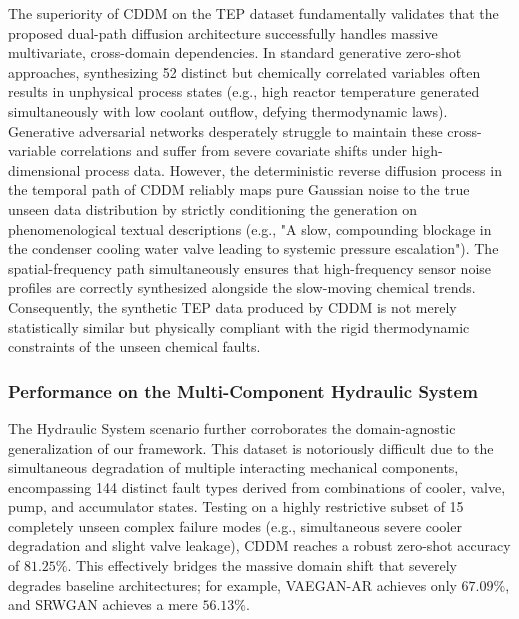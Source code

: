 The superiority of CDDM on the TEP dataset fundamentally validates that the proposed dual-path diffusion architecture successfully handles massive multivariate, cross-domain dependencies. In standard generative zero-shot approaches, synthesizing 52 distinct but chemically correlated variables often results in unphysical process states (e.g., high reactor temperature generated simultaneously with low coolant outflow, defying thermodynamic laws). Generative adversarial networks desperately struggle to maintain these cross-variable correlations and suffer from severe covariate shifts under high-dimensional process data. However, the deterministic reverse diffusion process in the temporal path of CDDM reliably maps pure Gaussian noise to the true unseen data distribution by strictly conditioning the generation on phenomenological textual descriptions (e.g., "A slow, compounding blockage in the condenser cooling water valve leading to systemic pressure escalation"). The spatial-frequency path simultaneously ensures that high-frequency sensor noise profiles are correctly synthesized alongside the slow-moving chemical trends. Consequently, the synthetic TEP data produced by CDDM is not merely statistically similar but physically compliant with the rigid thermodynamic constraints of the unseen chemical faults.

\subsubsection{Performance on the Multi-Component Hydraulic System}
The Hydraulic System scenario further corroborates the domain-agnostic generalization of our framework. This dataset is notoriously difficult due to the simultaneous degradation of multiple interacting mechanical components, encompassing 144 distinct fault types derived from combinations of cooler, valve, pump, and accumulator states. Testing on a highly restrictive subset of 15 completely unseen complex failure modes (e.g., simultaneous severe cooler degradation and slight valve leakage), CDDM reaches a robust zero-shot accuracy of $81.25\%$. This effectively bridges the massive domain shift that severely degrades baseline architectures; for example, VAEGAN-AR achieves only $67.09\%$, and SRWGAN achieves a mere $56.13\%$. 

